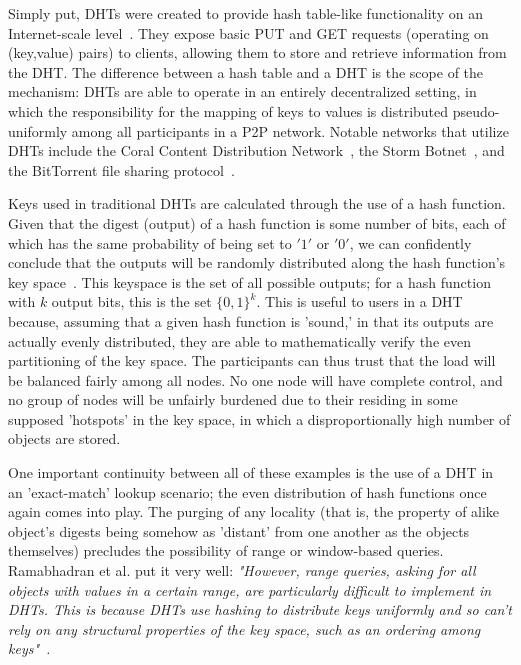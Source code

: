 \documentclass[10pt]{IEEEtran}
\begin{document}
\par Simply put, DHTs were created to provide hash table-like functionality on an Internet-scale level~\cite{Ratnasamy:2001wn}. They expose basic PUT and GET requests (operating on (key,value) pairs) to clients, allowing them to store and retrieve information from the DHT. The difference between a hash table and a DHT is the scope of the mechanism: DHTs are able to operate in an entirely decentralized setting, in which the responsibility for the mapping of keys to values is distributed pseudo-uniformly among all participants in a P2P network. Notable networks that utilize DHTs include the Coral Content Distribution Network~\cite{Freedman:2004vb}, the Storm Botnet~\cite{Holz:2008uk}, and the BitTorrent file sharing protocol~\cite{Cohen:y1_8mBnw}.

\par Keys used in traditional DHTs are calculated through the use of a hash function. Given that the digest (output) of a hash function is some number of bits, each of which has the same probability of being set to $'1'$ or $'0'$, we can confidently conclude that the outputs will be randomly distributed along the hash function's key space~\cite{Stoica:2001dj}. This keyspace is the set of all possible outputs; for a hash function with $k$ output bits, this is the set $\{0,1\}^k$. This is useful to users in a DHT because, assuming that a given hash function is 'sound,' in that its outputs are actually evenly distributed, they are able to mathematically verify the even partitioning of the key space. The participants can thus trust that the load will be balanced fairly among all nodes. No one node will have complete control, and no group of nodes will be unfairly burdened due to their residing in some supposed 'hotspots' in the key space, in which a disproportionally high number of objects are stored.

\par One important continuity between all of these examples is the use of a DHT in an 'exact-match' lookup scenario; the even distribution of hash functions once again comes into play. The purging of any locality (that is, the property of alike object's digests being somehow as 'distant' from one another as the objects themselves) precludes the possibility of range or window-based queries. Ramabhadran et al. put it very well: \textit{"However, range queries, asking for all objects with values in a certain range, are particularly difficult to implement in DHTs. This is because DHTs use hashing to distribute keys uniformly and so can't rely on any structural properties of the key space, such as an ordering among keys"}~\cite{Ramabhadran:2004tr}\textit{.}
\end{document}
